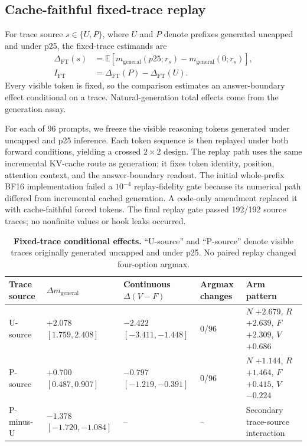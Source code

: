 \documentclass[letterpaper]{article}
\begin{document}
\subsection{Cache-faithful fixed-trace replay}

For trace source $s\in\{U,P\}$, where $U$ and $P$ denote prefixes generated uncapped and under p25, the fixed-trace estimands are
\begin{align}
\Delta_{\mathrm{FT}}(s)
&=\mathbb{E}\!\left[m_{\mathrm{general}}(p25;r_s)-m_{\mathrm{general}}(0;r_s)\right],\\
I_{\mathrm{FT}}&=\Delta_{\mathrm{FT}}(P)-\Delta_{\mathrm{FT}}(U).
\end{align}
Every visible token is fixed, so the comparison estimates an answer-boundary effect conditional on a trace.  Natural-generation total effects come from the generation assay.

For each of 96 prompts, we freeze the visible reasoning tokens generated under uncapped and p25 inference.  Each token sequence is then replayed under both forward conditions, yielding a crossed $2\times2$ design.  The replay path uses the same incremental KV-cache route as generation; it fixes token identity, position, attention context, and the answer-boundary readout.  The initial whole-prefix BF16 implementation failed a $10^{-4}$ replay-fidelity gate because its numerical path differed from incremental cached generation.  A code-only amendment replaced it with cache-faithful forced tokens.  The final replay gate passed 192/192 source traces; no nonfinite values or hook leaks occurred.

\begin{table}[t]
\centering
\small
\begin{tabular}{lL{3.0cm}L{3.0cm}L{3.0cm}L{3.5cm}}
\toprule
Trace source & $\Delta m_{\mathrm{general}}$ & Continuous $\Delta(V-F)$ & Argmax changes & Arm pattern \\
\midrule
U-source & $+2.078$ $[1.759,2.408]$ & $-2.422$ $[-3.411,-1.448]$ & 0/96 & $N$ $+2.679$, $R$ $+2.639$, $F$ $+2.309$, $V$ $+0.686$ \\
P-source & $+0.700$ $[0.487,0.907]$ & $-0.797$ $[-1.219,-0.391]$ & 0/96 & $N$ $+1.144$, $R$ $+1.464$, $F$ $+0.415$, $V$ $-0.224$ \\
P-minus-U & $-1.378$ $[-1.720,-1.084]$ & -- & -- & Secondary trace-source interaction \\
\bottomrule
\end{tabular}
\caption{\textbf{Fixed-trace conditional effects.} ``U-source'' and ``P-source'' denote visible traces originally generated uncapped and under p25.  No paired replay changed four-option argmax.}
\label{tab:supp-fixed}
\end{table}
\end{document}
